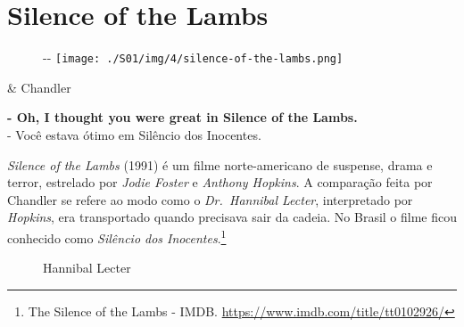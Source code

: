 \hypertarget{silence-of-the-lambs}{%
\section{Silence of the Lambs}\label{silence-of-the-lambs}}

\begin{figure}[!ht]
  \begin{adjustwidth}{-\oddsidemargin-1in}{-\rightmargin}
    \centering
    \texttt{[image: ./S01/img/4/silence-of-the-lambs.png]}
  \end{adjustwidth}
\end{figure}

\begin{tcolorbox}[enhanced,center upper,
    drop fuzzy shadow southeast, boxrule=0.3pt,
    lower separated=false, breakable,
    colframe=black!30!dialogoBorder,colback=white]
\begin{minipage}[c]{0.16\linewidth}
   & \centering \scriptsize{Chandler}
\end{minipage}
\hfill
\begin{minipage}[c]{0.8\linewidth}
  \textbf{- Oh, I thought you were great in Silence of the Lambs.}\\
  - Você estava ótimo em Silêncio dos Inocentes.
\end{minipage}
\end{tcolorbox}

\emph{Silence of the Lambs} (1991) é um filme norte-americano de
suspense, drama e terror, estrelado por \emph{Jodie Foster} e
\emph{Anthony Hopkins}. A comparação feita por Chandler se refere ao
modo como o \emph{Dr.~Hannibal Lecter}, interpretado por \emph{Hopkins},
era transportado quando precisava sair da cadeia. No Brasil o filme
ficou conhecido como \emph{Silêncio dos Inocentes}.\footnote{\sloppy The Silence of the Lambs - IMDB. \url{https://www.imdb.com/title/tt0102926/}}

\begin{figure}
  \centering
    \caption{Hannibal Lecter\label{fig:hannibal-lecter}}
\end{figure}
